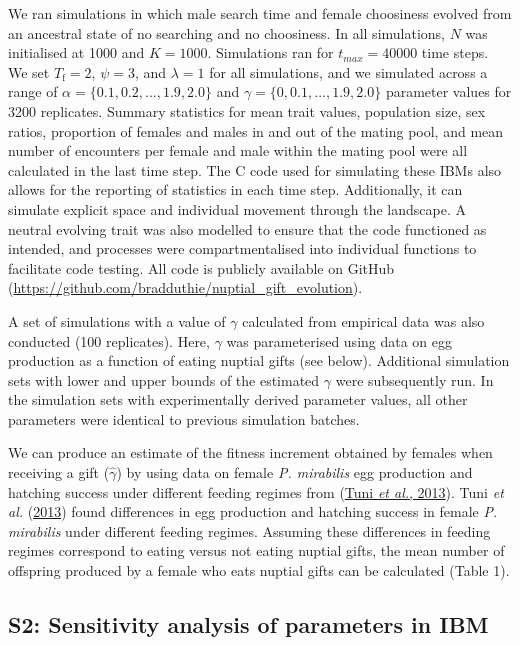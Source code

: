 \documentclass[
]{article}
\begin{document}
We ran simulations in which male search time and female choosiness
evolved from an ancestral state of no searching and no choosiness. In
all simulations, \(N\) was initialised at 1000 and \(K = 1000\).
Simulations ran for \(t_{max} = 40000\) time steps. We set
\(T_{\mathrm{f}} = 2\), \(\psi = 3\), and \(\lambda = 1\) for all
simulations, and we simulated across a range of
\(\alpha = \{0.1, 0.2, ..., 1.9, 2.0\}\) and
\(\gamma = \{0, 0.1, ..., 1.9, 2.0\}\) parameter values for 3200
replicates. Summary statistics for mean trait values, population size,
sex ratios, proportion of females and males in and out of the mating
pool, and mean number of encounters per female and male within the
mating pool were all calculated in the last time step. The C code used
for simulating these IBMs also allows for the reporting of statistics in
each time step. Additionally, it can simulate explicit space and
individual movement through the landscape. A neutral evolving trait was
also modelled to ensure that the code functioned as intended, and
processes were compartmentalised into individual functions to facilitate
code testing. All code is publicly available on GitHub
(\url{https://github.com/bradduthie/nuptial_gift_evolution}).

A set of simulations with a value of \(\gamma\) calculated from
empirical data was also conducted (100 replicates). Here, \(\gamma\) was
parameterised using data on egg production as a function of eating
nuptial gifts (see below). Additional simulation sets with lower and
upper bounds of the estimated \(\gamma\) were subsequently run. In the
simulation sets with experimentally derived parameter values, all other
parameters were identical to previous simulation batches.

We can produce an estimate of the fitness increment obtained by females
when receiving a gift (\(\hat{\gamma}\)) by using data on female
\emph{P. mirabilis} egg production and hatching success under different
feeding regimes from (\protect\hyperlink{ref-Tuni2013a}{Tuni \emph{et
al.}, 2013}). Tuni \emph{et al.}
(\protect\hyperlink{ref-Tuni2013a}{2013}) found differences in egg
production and hatching success in female \emph{P. mirabilis} under
different feeding regimes. Assuming these differences in feeding regimes
correspond to eating versus not eating nuptial gifts, the mean number of
offspring produced by a female who eats nuptial gifts can be calculated
(Table 1).

\clearpage

\hypertarget{s2-sensitivity-analysis-of-parameters-in-ibm}{%
\subsection{S2: Sensitivity analysis of parameters in
IBM}\label{s2-sensitivity-analysis-of-parameters-in-ibm}}
\end{document}
